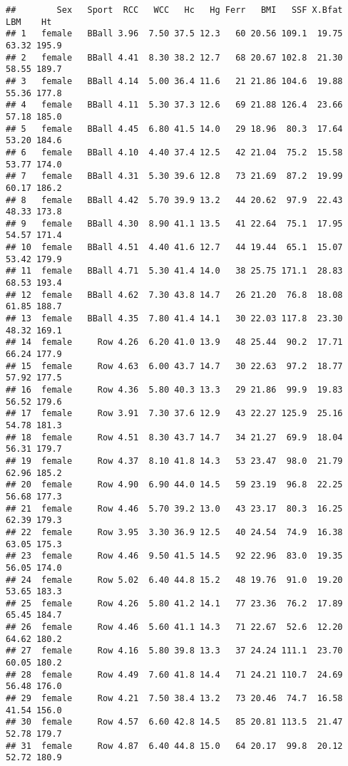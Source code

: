 \documentclass[
]{article}
\begin{document}
\begin{verbatim}
##        Sex   Sport  RCC   WCC   Hc   Hg Ferr   BMI   SSF X.Bfat    LBM    Ht
## 1   female   BBall 3.96  7.50 37.5 12.3   60 20.56 109.1  19.75  63.32 195.9
## 2   female   BBall 4.41  8.30 38.2 12.7   68 20.67 102.8  21.30  58.55 189.7
## 3   female   BBall 4.14  5.00 36.4 11.6   21 21.86 104.6  19.88  55.36 177.8
## 4   female   BBall 4.11  5.30 37.3 12.6   69 21.88 126.4  23.66  57.18 185.0
## 5   female   BBall 4.45  6.80 41.5 14.0   29 18.96  80.3  17.64  53.20 184.6
## 6   female   BBall 4.10  4.40 37.4 12.5   42 21.04  75.2  15.58  53.77 174.0
## 7   female   BBall 4.31  5.30 39.6 12.8   73 21.69  87.2  19.99  60.17 186.2
## 8   female   BBall 4.42  5.70 39.9 13.2   44 20.62  97.9  22.43  48.33 173.8
## 9   female   BBall 4.30  8.90 41.1 13.5   41 22.64  75.1  17.95  54.57 171.4
## 10  female   BBall 4.51  4.40 41.6 12.7   44 19.44  65.1  15.07  53.42 179.9
## 11  female   BBall 4.71  5.30 41.4 14.0   38 25.75 171.1  28.83  68.53 193.4
## 12  female   BBall 4.62  7.30 43.8 14.7   26 21.20  76.8  18.08  61.85 188.7
## 13  female   BBall 4.35  7.80 41.4 14.1   30 22.03 117.8  23.30  48.32 169.1
## 14  female     Row 4.26  6.20 41.0 13.9   48 25.44  90.2  17.71  66.24 177.9
## 15  female     Row 4.63  6.00 43.7 14.7   30 22.63  97.2  18.77  57.92 177.5
## 16  female     Row 4.36  5.80 40.3 13.3   29 21.86  99.9  19.83  56.52 179.6
## 17  female     Row 3.91  7.30 37.6 12.9   43 22.27 125.9  25.16  54.78 181.3
## 18  female     Row 4.51  8.30 43.7 14.7   34 21.27  69.9  18.04  56.31 179.7
## 19  female     Row 4.37  8.10 41.8 14.3   53 23.47  98.0  21.79  62.96 185.2
## 20  female     Row 4.90  6.90 44.0 14.5   59 23.19  96.8  22.25  56.68 177.3
## 21  female     Row 4.46  5.70 39.2 13.0   43 23.17  80.3  16.25  62.39 179.3
## 22  female     Row 3.95  3.30 36.9 12.5   40 24.54  74.9  16.38  63.05 175.3
## 23  female     Row 4.46  9.50 41.5 14.5   92 22.96  83.0  19.35  56.05 174.0
## 24  female     Row 5.02  6.40 44.8 15.2   48 19.76  91.0  19.20  53.65 183.3
## 25  female     Row 4.26  5.80 41.2 14.1   77 23.36  76.2  17.89  65.45 184.7
## 26  female     Row 4.46  5.60 41.1 14.3   71 22.67  52.6  12.20  64.62 180.2
## 27  female     Row 4.16  5.80 39.8 13.3   37 24.24 111.1  23.70  60.05 180.2
## 28  female     Row 4.49  7.60 41.8 14.4   71 24.21 110.7  24.69  56.48 176.0
## 29  female     Row 4.21  7.50 38.4 13.2   73 20.46  74.7  16.58  41.54 156.0
## 30  female     Row 4.57  6.60 42.8 14.5   85 20.81 113.5  21.47  52.78 179.7
## 31  female     Row 4.87  6.40 44.8 15.0   64 20.17  99.8  20.12  52.72 180.9

\end{verbatim}
\end{document}
